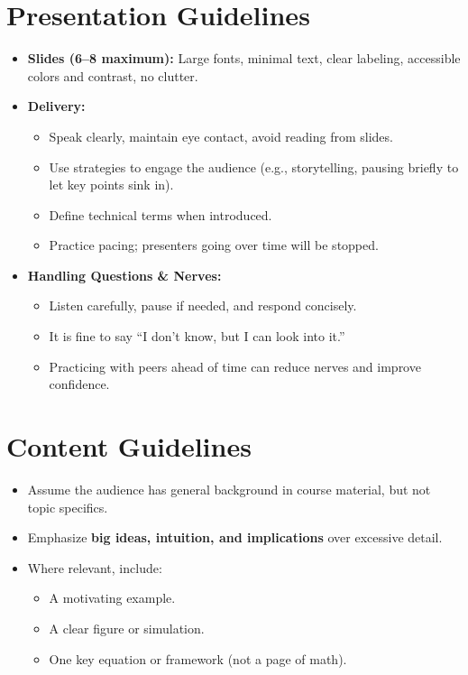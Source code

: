 \documentclass[11pt]{article}
\begin{document}
\section*{Presentation Guidelines}
\begin{itemize}
    \item \textbf{Slides (6--8 maximum):} Large fonts, minimal text, clear labeling, accessible colors and contrast, no clutter.
    \item \textbf{Delivery:}
    \begin{itemize}
        \item Speak clearly, maintain eye contact, avoid reading from slides.
        \item Use strategies to engage the audience (e.g., storytelling, pausing briefly to let key points sink in).
        \item Define technical terms when introduced.
        \item Practice pacing; presenters going over time will be stopped.
    \end{itemize}
    \item \textbf{Handling Questions \& Nerves:}
    \begin{itemize}
        \item Listen carefully, pause if needed, and respond concisely.
        \item It is fine to say ``I don’t know, but I can look into it.''
        \item Practicing with peers ahead of time can reduce nerves and improve confidence.
    \end{itemize}
\end{itemize}

\section*{Content Guidelines}
\begin{itemize}
    \item Assume the audience has general background in course material, but not topic specifics.
    \item Emphasize \textbf{big ideas, intuition, and implications} over excessive detail.
    \item Where relevant, include:
    \begin{itemize}
        \item A motivating example.
        \item A clear figure or simulation.
        \item One key equation or framework (not a page of math).
    \end{itemize}
\end{itemize}
\end{document}
